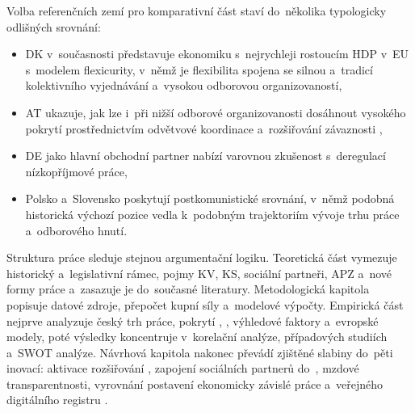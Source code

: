 Volba referenčních zemí pro komparativní část staví  do~několika typologicky odlišných srovnání:
\begin{itemize}
  \item \acl{DK} v~současnosti představuje ekonomiku s~nejrychleji rostoucím \acs{HDP} v~\acs{EU} s~modelem flexicurity, v~němž je flexibilita spojena se silnou  a~tradicí kolektivního vyjednávání a~vysokou odborovou organizovaností,
  \item \acl{AT} ukazuje, jak lze i~při nižší odborové organizovanosti dosáhnout vysokého pokrytí  prostřednictvím odvětvové koordinace a~rozšiřování závaznosti ,
  \item \acl{DE} jako hlavní obchodní partner  nabízí varovnou zkušenost s~deregulací nízkopříjmové práce,
  \item Polsko a~Slovensko poskytují postkomunistické srovnání, v~němž podobná historická výchozí pozice vedla k~podobným trajektoriím vývoje trhu práce a~odborového hnutí.
\end{itemize}

Struktura práce sleduje stejnou argumentační logiku. Teoretická část vymezuje historický a~legislativní rámec, pojmy \acl{KV}, \acl{KS}, sociální partneři, \acl{APZ} a~nové formy práce a~zasazuje je do~současné literatury. Metodologická kapitola popisuje datové zdroje, přepočet kupní síly a~modelové výpočty. Empirická část nejprve analyzuje český trh práce, pokrytí , , výhledové faktory a~evropské modely, poté výsledky koncentruje v~korelační analýze, případových studiích a~SWOT analýze. Návrhová kapitola nakonec převádí zjištěné slabiny do~pěti inovací: aktivace rozšiřování , zapojení sociálních partnerů do~, mzdové transparentnosti, vyrovnání postavení ekonomicky závislé práce a~veřejného digitálního registru .\par
